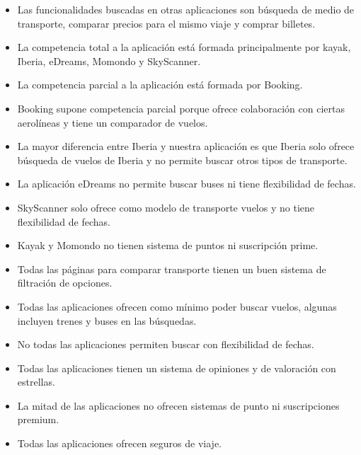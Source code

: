 \begin{itemize}
    \item Las funcionalidades buscadas en otras aplicaciones son búsqueda de medio de transporte, comparar precios para el mismo viaje y comprar billetes.
    \item La competencia total a la aplicación está formada principalmente por kayak, Iberia, eDreams, Momondo y SkyScanner.
    \item La competencia parcial a la aplicación está formada por Booking.
    \item Booking supone competencia parcial porque ofrece colaboración con ciertas aerolíneas y tiene un comparador de vuelos.
    \item La mayor diferencia entre Iberia y nuestra aplicación es que Iberia solo ofrece búsqueda de vuelos de Iberia y no permite buscar  otros tipos de transporte.
    \item La aplicación eDreams no permite buscar buses ni tiene flexibilidad de fechas.
    \item SkyScanner solo ofrece como modelo de transporte vuelos y no tiene flexibilidad de fechas.
    \item Kayak y Momondo no tienen sistema de puntos ni suscripción prime.
    \item Todas las páginas para comparar transporte tienen un buen sistema de filtración de opciones.
    \item Todas las aplicaciones ofrecen como mínimo poder buscar vuelos, algunas incluyen trenes y buses en las búsquedas.
    \item No todas las aplicaciones permiten buscar con flexibilidad de fechas.
    \item Todas las aplicaciones tienen un sistema de opiniones y de valoración con estrellas.
    \item La mitad de las aplicaciones no ofrecen sistemas de punto ni suscripciones premium.
    \item Todas las aplicaciones ofrecen seguros de viaje.
\end{itemize}
